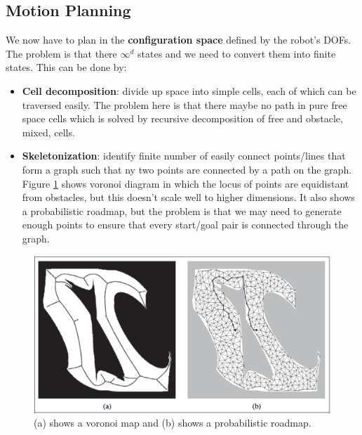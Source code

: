 \documentclass[twoside]{article}
\begin{document}
\subsection{Motion Planning}
We now have to plan in the \textbf{configuration space} defined by the robot's DOFs. The 
problem is that there \(\infty^d\) states and we need to convert them into 
finite states. This can be done by:
\begin{itemize}
        \item \textbf{Cell decomposition}: divide up space into simple cells, 
        each of which can be traversed easily. The problem here is that there
        maybe no path in pure free space cells which is solved by recursive 
        decomposition of free and obstacle, mixed, cells.
        \item \textbf{Skeletonization}: identify finite number of easily connect 
        points/lines that form a graph such that ny two points are connected by 
        a path on the graph. Figure \ref{fig:maps} shows voronoi diagram in 
        which the locus of points are equidistant from obstacles, but this 
        doesn't scale well to higher dimensions. It also shows a probabilistic 
        roadmap, but the problem is that we may need to generate enough points 
        to ensure that every start/goal pair is connected through the graph.
\end{itemize}
\begin{figure}
  \includegraphics[width=\linewidth]{maps.png}
  \caption{(a) shows a voronoi map and (b) shows a probabilistic roadmap.}
  \label{fig:maps}
\end{figure}
\end{document}

